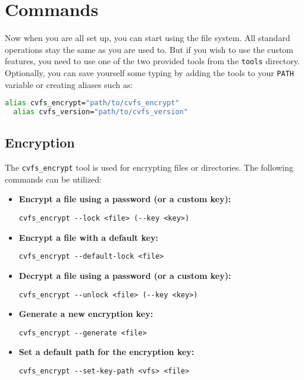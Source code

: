 \section*{Commands}

Now when you are all set up, you can start using the file system.
All standard operations stay the same as you are used to.
But if you wish to use the custom features, you need to use one of the two provided tools from the \texttt{tools} directory.
Optionally, you can save yourself some typing by adding the tools to your \texttt{PATH} variable or creating aliases such as:

\begin{lstlisting}[language=bash, basicstyle=\ttfamily\small]
  alias cvfs_encrypt="path/to/cvfs_encrypt"
  alias cvfs_version="path/to/cvfs_version"
\end{lstlisting}

\subsection*{Encryption}

The \texttt{cvfs\_encrypt} tool is used for encrypting files or directories.
The following commands can be utilized:

\begin{itemize}
    \setlength\itemsep{-0.1em}
    \item \textbf{Encrypt a file using a password (or a custom key):} \\
    \begin{BVerbatim}[baseline=t,boxwidth=10cm]
  cvfs_encrypt --lock <file> (--key <key>)
    \end{BVerbatim}

    \item \textbf{Encrypt a file with a default key:} \\
    \begin{BVerbatim}[baseline=t,boxwidth=10cm]
  cvfs_encrypt --default-lock <file>
    \end{BVerbatim}

    \item \textbf{Decrypt a file using a password (or a custom key):} \\
    \begin{BVerbatim}[baseline=t,boxwidth=10cm]
  cvfs_encrypt --unlock <file> (--key <key>)
    \end{BVerbatim}

    \item \textbf{Generate a new encryption key:} \\
    \begin{BVerbatim}[baseline=t,boxwidth=10cm]
  cvfs_encrypt --generate <file>
    \end{BVerbatim}

    \item \textbf{Set a default path for the encryption key:} \\
    \begin{BVerbatim}[baseline=t,boxwidth=10cm]
  cvfs_encrypt --set-key-path <vfs> <file>
    \end{BVerbatim}
\end{itemize}

